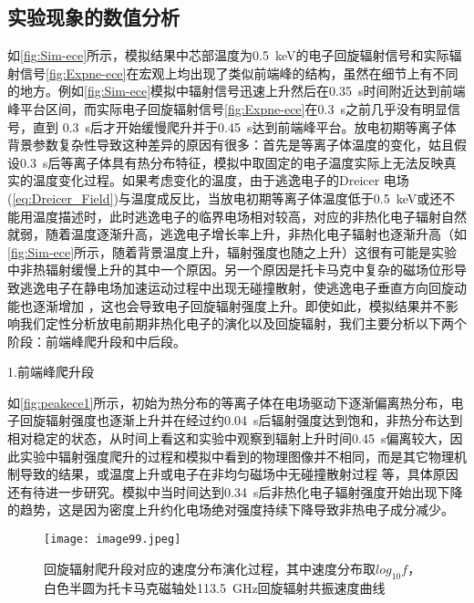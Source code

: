 \subsection{实验现象的数值分析}
如\autoref{fig:Sim-ece}所示，模拟结果中芯部温度为0.5~keV的电子回旋辐射信号和实际辐射信号\autoref{fig:Expne-ece}在宏观上均出现了类似前端峰的结构，虽然在细节上有不同的地方。例如\autoref{fig:Sim-ece}模拟中辐射信号迅速上升然后在0.35~s时间附近达到前端峰平台区间，而实际电子回旋辐射信号\autoref{fig:Expne-ece}在0.3~s之前几乎没有明显信号，直到 0.3~s后才开始缓慢爬升并于0.45~s达到前端峰平台。放电初期等离子体背景参数复杂性导致这种差异的原因有很多：首先是等离子体温度的变化，姑且假设0.3~s后等离子体具有热分布特征，模拟中取固定的电子温度实际上无法反映真实的温度变化过程。如果考虑变化的温度，由于逃逸电子的Dreicer 电场(\autoref{eq:Dreicer_Field})与温度成反比，当放电初期等离子体温度低于0.5~keV或还不能用温度描述时，此时逃逸电子的临界电场相对较高，对应的非热化电子辐射自然就弱，随着温度逐渐升高，逃逸电子增长率上升，非热化电子辐射也逐渐升高（如\autoref{fig:Sim-ece}所示，随着背景温度上升，辐射强度也随之上升）这很有可能是实验中非热辐射缓慢上升的其中一个原因。另一个原因是托卡马克中复杂的磁场位形导致逃逸电子在静电场加速运动过程中出现无碰撞散射，使逃逸电子垂直方向回旋动能也逐渐增加\cite{RN1794} ，这也会导致电子回旋辐射强度上升。即使如此，模拟结果并不影响我们定性分析放电前期非热化电子的演化以及回旋辐射，我们主要分析以下两个阶段：前端峰爬升段和中后段。
\par \noindent
1.前端峰爬升段


如\autoref{fig:peakece1}所示，初始为热分布的等离子体在电场驱动下逐渐偏离热分布，电子回旋辐射强度也逐渐上升并在经过约0.04~s后辐射强度达到饱和，非热分布达到相对稳定的状态，从时间上看这和实验中观察到辐射上升时间0.45~s偏离较大，因此实验中辐射强度爬升的过程和模拟中看到的物理图像并不相同，而是其它物理机制导致的结果，或温度上升或电子在非均匀磁场中无碰撞散射过程\cite{RN1794}	等，具体原因还有待进一步研究。模拟中当时间达到0.34~s后非热化电子辐射强度开始出现下降的趋势，这是因为密度上升约化电场绝对强度持续下降导致非热电子成分减少。

\begin{figure}
\centering
\texttt{[image: image99.jpeg]}
\caption{\label{fig:peakece1} 回旋辐射爬升段对应的速度分布演化过程，其中速度分布取$log_{10}⁡f$，白色半圆为托卡马克磁轴处113.5~GHz回旋辐射共振速度曲线}
\end{figure}


